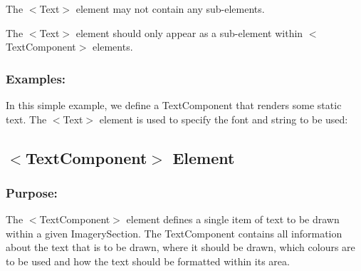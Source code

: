 \begin{DoxyItemize}
\item The {\ttfamily $<$Text$>$} element may not contain any sub-\/elements. 
\item The {\ttfamily $<$Text$>$} element should only appear as a sub-\/element within {\ttfamily $<$Text\+Component$>$} elements. 
\end{DoxyItemize}\hypertarget{fal_element_ref_fal_elem_ref_sec_31_4}{}\subsubsection{Examples\+:}\label{fal_element_ref_fal_elem_ref_sec_31_4}
In this simple example, we define a Text\+Component that renders some static text. The {\ttfamily $<$Text$>$} element is used to specify the font and string to be used\+: 
\begin{DoxyCode}{0}
\end{DoxyCode}
\hypertarget{fal_element_ref_fal_elem_ref_sec_32}{}\subsection{$<$\+Text\+Component$>$ Element}\label{fal_element_ref_fal_elem_ref_sec_32}
\hypertarget{fal_element_ref_fal_elem_ref_sec_32_1}{}\subsubsection{Purpose\+:}\label{fal_element_ref_fal_elem_ref_sec_32_1}
The {\ttfamily $<$Text\+Component$>$} element defines a single item of text to be drawn within a given Imagery\+Section. The Text\+Component contains all information about the text that is to be drawn, where it should be drawn, which colours are to be used and how the text should be formatted within its area.


